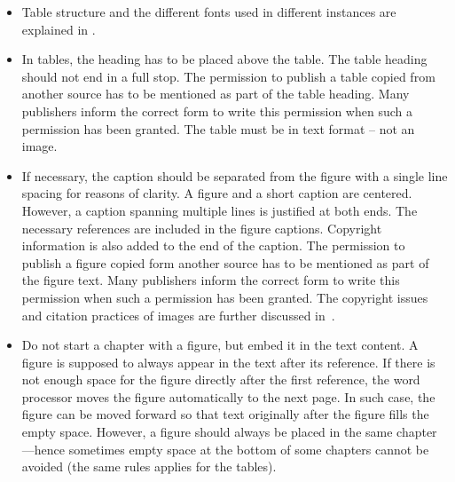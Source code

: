 \begin{itemize}
    \setlength\itemsep{0pt}
    \setlength\parskip{0pt}
  \item Table structure and the different fonts used in different
    instances are explained in .
  \item In tables, the heading has to be placed above the table. The
    table heading should not end in a full stop. The permission to
    publish a table copied from another source has to be mentioned as
    part of the table heading. Many publishers inform the correct
    form to write this permission when such a permission has been
    granted. The table must be in text format – not an image.
  \item If necessary, the caption should be separated from the figure
    with a single line spacing for reasons of clarity. A figure and a
    short caption are centered. However, a caption spanning multiple
    lines is justified at both ends. The necessary references are
    included in the figure captions. Copyright information is also
    added to the end of the caption. The permission to publish a
    figure copied form another source has to be mentioned as part of
    the figure text. Many publishers inform the correct form to write
    this permission when such a permission has been granted.  The
    copyright issues and citation practices of images are further
    discussed in~.
  \item Do not start a chapter with a figure, but embed it in the
    text content. A figure is supposed to always appear in the text
    after its reference. If there is not enough space for the figure
    directly after the first reference, the word processor moves the
    figure automatically to the next page. In such case, the figure
    can be moved forward so that text originally after the figure
    fills the empty space. However, a figure should always be placed
    in the same chapter---hence sometimes empty space at the bottom
    of some chapters cannot be avoided (the same rules applies for the tables).
\end{itemize}

